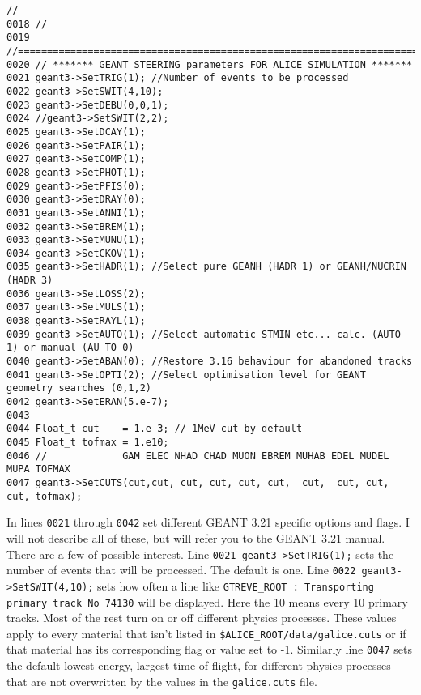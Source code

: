 \scriptsize
\begin{verbatim}//
0018 //
0019 //=======================================================================
0020 // ******* GEANT STEERING parameters FOR ALICE SIMULATION *******
0021 geant3->SetTRIG(1); //Number of events to be processed 
0022 geant3->SetSWIT(4,10);
0023 geant3->SetDEBU(0,0,1);
0024 //geant3->SetSWIT(2,2);
0025 geant3->SetDCAY(1);
0026 geant3->SetPAIR(1);
0027 geant3->SetCOMP(1);
0028 geant3->SetPHOT(1);
0029 geant3->SetPFIS(0);
0030 geant3->SetDRAY(0);
0031 geant3->SetANNI(1);
0032 geant3->SetBREM(1);
0033 geant3->SetMUNU(1);
0034 geant3->SetCKOV(1);
0035 geant3->SetHADR(1); //Select pure GEANH (HADR 1) or GEANH/NUCRIN (HADR 3)
0036 geant3->SetLOSS(2);
0037 geant3->SetMULS(1);
0038 geant3->SetRAYL(1);
0039 geant3->SetAUTO(1); //Select automatic STMIN etc... calc. (AUTO 1) or manual (AU TO 0)
0040 geant3->SetABAN(0); //Restore 3.16 behaviour for abandoned tracks
0041 geant3->SetOPTI(2); //Select optimisation level for GEANT geometry searches (0,1,2)
0042 geant3->SetERAN(5.e-7);
0043 
0044 Float_t cut    = 1.e-3; // 1MeV cut by default
0045 Float_t tofmax = 1.e10;
0046 //             GAM ELEC NHAD CHAD MUON EBREM MUHAB EDEL MUDEL MUPA TOFMAX
0047 geant3->SetCUTS(cut,cut, cut, cut, cut, cut,  cut,  cut, cut,  cut, tofmax);
\end{verbatim}
\normalsize

In lines \texttt{0021} through \texttt{0042} set different GEANT 3.21 specific
options and flags. I will not describe all of these, but will refer you to the
GEANT 3.21 manual. There are a few of possible interest. Line 
\texttt{0021 geant3->SetTRIG(1);} sets the number of events that will be
processed. The default is one. Line \texttt{0022 geant3->SetSWIT(4,10);} sets
how often a line like 
\texttt{GTREVE\_ROOT : Transporting primary track No 74130} will be
displayed. Here the 10 means every 10 primary tracks. Most of the rest turn on
or off different physics processes. These values apply to every material that
isn't listed in \texttt{\$ALICE\_ROOT/data/galice.cuts} or if that material has
its corresponding flag or value set to -1. Similarly line \texttt{0047} sets
the default lowest energy, largest time of flight, for different physics
processes that are not overwritten by the values in the \texttt{galice.cuts}
file.

